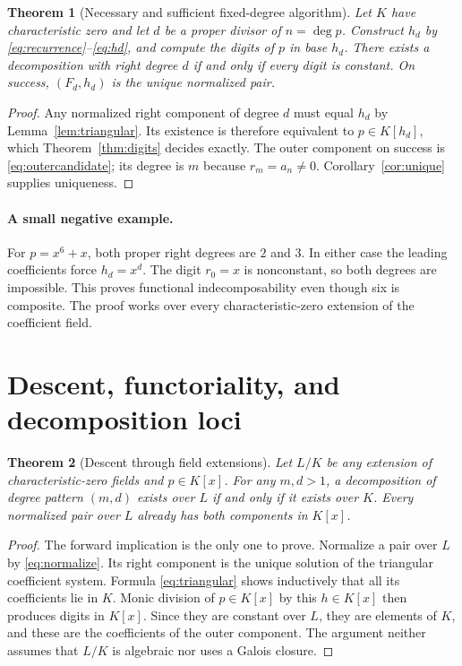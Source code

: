 \documentclass[11pt,a4paper]{article}
\numberwithin{equation}{section}
\newtheorem{theorem}{Theorem}[section]
\theoremstyle{definition}
\theoremstyle{remark}
\begin{document}
\begin{theorem}[Necessary and sufficient fixed-degree algorithm]
\label{thm:fixed}
Let $K$ have characteristic zero and let $d$ be a proper divisor of
$n=\deg p$. Construct $h_d$ by \eqref{eq:recurrence}--\eqref{eq:hd}, and
compute the digits of $p$ in base $h_d$. There exists a decomposition with
right degree $d$ if and only if every digit is constant. On success,
$(F_d,h_d)$ is the unique normalized pair.
\end{theorem}
\begin{proof}
Any normalized right component of degree $d$ must equal $h_d$ by
Lemma~\ref{lem:triangular}. Its existence is therefore equivalent to
$p\in K[h_d]$, which Theorem~\ref{thm:digits} decides exactly. The outer
component on success is \eqref{eq:outercandidate}; its degree is $m$ because
$r_m=a_n\ne0$. Corollary~\ref{cor:unique} supplies uniqueness.
\end{proof}

\paragraph{A small negative example.}
For $p=x^6+x$, both proper right degrees are $2$ and $3$. In either case the
leading coefficients force $h_d=x^d$. The digit $r_0=x$ is nonconstant, so
both degrees are impossible. This proves functional indecomposability even
though six is composite. The proof works over every characteristic-zero
extension of the coefficient field.

\section{Descent, functoriality, and decomposition loci}
\label{sec:descent}
\begin{theorem}[Descent through field extensions]
\label{thm:descent}
Let $L/K$ be any extension of characteristic-zero fields and $p\in K[x]$.
For any $m,d>1$, a decomposition of degree pattern $(m,d)$ exists over $L$
if and only if it exists over $K$. Every normalized pair over $L$ already
has both components in $K[x]$.
\end{theorem}
\begin{proof}
The forward implication is the only one to prove. Normalize a pair over $L$
by \eqref{eq:normalize}. Its right component is the unique solution of the
triangular coefficient system. Formula \eqref{eq:triangular} shows inductively
that all its coefficients lie in $K$. Monic division of $p\in K[x]$ by this
$h\in K[x]$ then produces digits in $K[x]$. Since they are constant over $L$,
they are elements of $K$, and these are the coefficients of the outer
component. The argument neither assumes that $L/K$ is algebraic nor uses a
Galois closure.
\end{proof}
\end{document}

